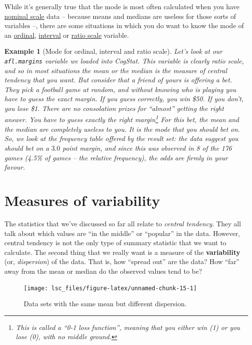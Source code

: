 \documentclass[
  11pt,
]{book}
\theoremstyle{indenteddefinition}
\theoremstyle{indenteddefinition}
\newtheorem{example}{Example}[chapter]
\theoremstyle{definition}
\theoremstyle{definition}
\theoremstyle{remark}
\begin{document}
While it's generally true that the mode is most often calculated when you have \protect\hyperlink{nominalscale}{nominal scale} data -- because means and medians are useless for those sorts of variables --, there are some situations in which you do want to know the mode of an \protect\hyperlink{ordinalscale}{ordinal}, \protect\hyperlink{intervalscale}{interval} or \protect\hyperlink{ratioscale}{ratio scale} variable.

\begin{example}[Mode for ordinal, interval and ratio scale]
\protect\hypertarget{exm:exmode2}{}\label{exm:exmode2}Let's look at our \texttt{afl.margins} variable we loaded into CogStat. This variable is clearly ratio scale, and so in most situations the mean or the median is the measure of central tendency that you want. But consider that a friend of yours is offering a bet. They pick a football game at random, and without knowing who is playing you have to guess the \emph{exact} margin. If you guess correctly, you win \$50. If you don't, you lose \$1. There are no consolation prizes for ``almost'' getting the right answer. You have to guess exactly the right margin\footnote{This is called a ``0-1 loss function'', meaning that you either win (1) or you lose (0), with no middle ground.} For this bet, the mean and the median are completely useless to you. It is the mode that you should bet on. So, we look at the frequency table offered by the result set: the data suggest you should bet on a \(3.0\) point margin, and since this was observed in 8 of the 176 games (4.5\% of games -- the \emph{relative frequency}), the odds are firmly in your favour.
\end{example}

\hypertarget{var}{%
\section{Measures of variability}\label{var}}

The statistics that we've discussed so far all relate to \emph{central tendency}. They all talk about which values are ``in the middle'' or ``popular'' in the data. However, central tendency is not the only type of summary statistic that we want to calculate. The second thing that we really want is a measure of the \textbf{variability} (or, \emph{dispersion}) of the data. That is, how ``spread out'' are the data? How ``far'' away from the mean or median do the observed values tend to be?

\begin{figure}

{\centering \texttt{[image: lsc\_files/figure-latex/unnamed-chunk-15-1]} 

}

\caption{Data sets with the same mean but different dispersion.}\label{fig:unnamed-chunk-15}
\end{figure}
\end{document}

